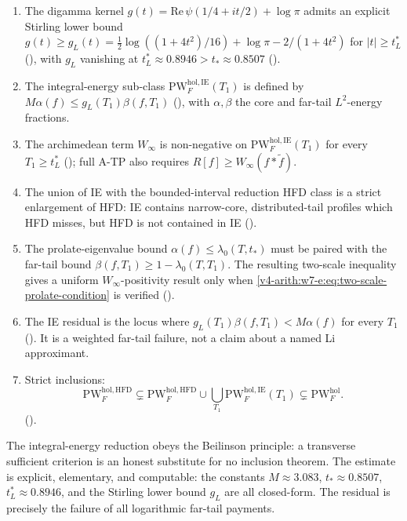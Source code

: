 \begin{enumerate}
\item The digamma kernel \(g(t)=\mathrm{Re}\,\psi(1/4+it/2)+\log\pi\)
admits an explicit Stirling lower bound
\(g(t)\geq g_{L}(t)=\tfrac{1}{2}\log((1+4t^{2})/16)+\log\pi-2/(1+4t^{2})\)
for \(|t|\geq t_{L}^{\ast}\)
(), with \(g_{L}\) vanishing at
\(t_{L}^{\ast}\approx 0.8946>t_{\ast}\approx 0.8507\)
().
\item The integral-energy sub-class
\(\mathrm{PW}^{\mathrm{hol},\mathrm{IE}}_{F}(T_{1})\) is defined by
\(M\alpha(f)\leq g_{L}(T_{1})\beta(f,T_{1})\)
(), with \(\alpha,\beta\) the
core and far-tail \(L^{2}\)-energy fractions.
\item The archimedean term \(W_{\infty}\) is non-negative on
\(\mathrm{PW}^{\mathrm{hol},\mathrm{IE}}_{F}(T_{1})\) for every
\(T_{1}\geq t_{L}^{\ast}\)
(); full A-TP also requires
\(R[f]\geq W_{\infty}(f*\widetilde f)\).
\item The union of IE with the bounded-interval reduction HFD class is a strict
enlargement of HFD: IE contains narrow-core, distributed-tail profiles
which HFD misses, but HFD is not contained in IE
().
\item The prolate-eigenvalue bound
\(\alpha(f)\leq\lambda_{0}(T,t_{\ast})\) must be paired with the
far-tail bound
\(\beta(f,T_{1})\geq1-\lambda_{0}(T,T_{1})\). The resulting two-scale
inequality gives a uniform \(W_{\infty}\)-positivity result only when
\eqref{v4-arith:w7-e:eq:two-scale-prolate-condition} is verified
().
\item The IE residual is the locus where
\(g_{L}(T_{1})\beta(f,T_{1})<M\alpha(f)\) for every \(T_{1}\)
(). It is a weighted far-tail
failure, not a claim about a named Li approximant.
\item Strict inclusions:
\[
\mathrm{PW}^{\mathrm{hol},\mathrm{HFD}}_{F}\subsetneq
\mathrm{PW}^{\mathrm{hol},\mathrm{HFD}}_{F}\cup
\bigcup_{T_{1}}\mathrm{PW}^{\mathrm{hol},\mathrm{IE}}_{F}(T_{1})
\subsetneq\mathrm{PW}^{\mathrm{hol}}_{F}.
\]
().
\end{enumerate}

\begin{remark}
\label{v4-arith:w7-e:rem:beilinson-closing}
The integral-energy reduction obeys the Beilinson principle: a
transverse sufficient criterion is an honest substitute for no
inclusion theorem. The estimate is explicit, elementary, and
computable: the constants
\(M\approx 3.083\), \(t_{\ast}\approx 0.8507\),
\(t_{L}^{\ast}\approx 0.8946\), and the Stirling lower bound \(g_{L}\)
are all closed-form. The residual is precisely the failure of all
logarithmic far-tail payments.
\end{remark}

